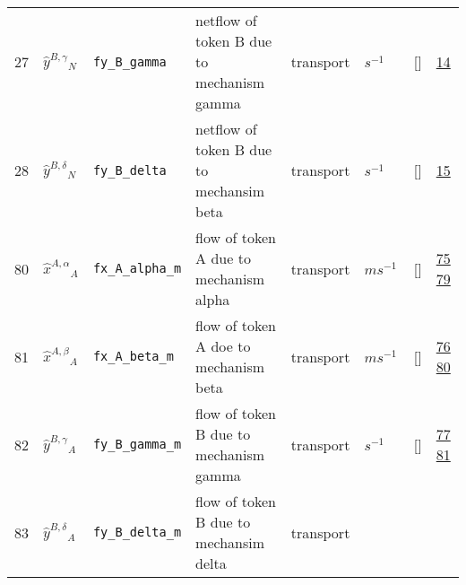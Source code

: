 \begin{longtable}{|p{1cm}|p{3cm}|p{3cm}|p{7cm}|p{3.0cm}|p{3cm}|p{2cm}|p{1cm}|}
                 \\
    27
             & \hypertarget{"v:27"}{ $ {{\hat{y}^{B,\gamma}}}{_{N}} $}
             & \verb|fy_B_gamma|
             & netflow of token B due to mechanism gamma
             & \begin{lay}transport \end{lay}
             & $ s^{-1} \, $
             & []
             & \hyperlink{"e:14"}{ 14 }
                 \\
    28
             & \hypertarget{"v:28"}{ $ {{\hat{y}^{B,\delta}}}{_{N}} $}
             & \verb|fy_B_delta|
             & netflow of token B due to mechansim beta
             & \begin{lay}transport \end{lay}
             & $ s^{-1} \, $
             & []
             & \hyperlink{"e:15"}{ 15 }
                 \\
    80
             & \hypertarget{"v:80"}{ $ {{\hat{x}^{A,\alpha}}}{_{A}} $}
             & \verb|fx_A_alpha_m|
             & flow of token A due to mechanism alpha
             & \begin{lay}transport \end{lay}
             & $ m s^{-1} \, $
             & []
             & \hyperlink{"e:75"}{ 75 }
                 \hyperlink{"e:79"}{ 79 }
                 \\
    81
             & \hypertarget{"v:81"}{ $ {{\hat{x}^{A,\beta}}}{_{A}} $}
             & \verb|fx_A_beta_m|
             & flow of token A doe to mechanism beta
             & \begin{lay}transport \end{lay}
             & $ m s^{-1} \, $
             & []
             & \hyperlink{"e:76"}{ 76 }
                 \hyperlink{"e:80"}{ 80 }
                 \\
    82
             & \hypertarget{"v:82"}{ $ {{\hat{y}^{B,\gamma}}}{_{A}} $}
             & \verb|fy_B_gamma_m|
             & flow of token B due to mechanism gamma
             & \begin{lay}transport \end{lay}
             & $ s^{-1} \, $
             & []
             & \hyperlink{"e:77"}{ 77 }
                 \hyperlink{"e:81"}{ 81 }
                 \\
    83
             & \hypertarget{"v:83"}{ $ {{\hat{y}^{B,\delta}}}{_{A}} $}
             & \verb|fy_B_delta_m|
             & flow of token B due to mechansim delta
             & \begin{lay}transport \end{lay}

\end{longtable}
